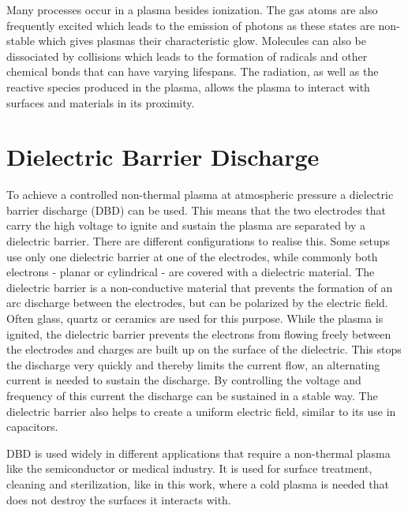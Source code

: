 Many processes occur in a plasma besides ionization. The gas atoms are also frequently excited which leads to the emission of photons as these states are non-stable which gives plasmas their characteristic glow. Molecules can also be dissociated by collisions which leads to the formation of radicals and other chemical bonds that can have varying lifespans. The radiation, as well as the reactive species produced in the plasma, allows the plasma to interact with surfaces and materials in its proximity.

\section{Dielectric Barrier Discharge}
To achieve a controlled non-thermal plasma at atmospheric pressure a dielectric barrier discharge (DBD) can be used. This means that the two electrodes that carry the high voltage to ignite and sustain the plasma are separated by a dielectric barrier. There are different configurations to realise this. Some setups use only one dielectric barrier at one of the electrodes, while commonly both electrons - planar or cylindrical - are covered with a dielectric material. The dielectric barrier is a non-conductive material that prevents the formation of an arc discharge between the electrodes, but can be polarized by the electric field. Often glass, quartz or ceramics are used for this purpose. While the plasma is ignited, the dielectric barrier prevents the electrons from flowing freely between the electrodes and charges are built up on the surface of the dielectric. This stops the discharge very quickly and thereby limits the current flow, an alternating current is needed to sustain the discharge. By controlling the voltage and frequency of this current the discharge can be sustained in a stable way. The dielectric barrier also helps to create a uniform electric field, similar to its use in capacitors. 

DBD is used widely in different applications that require a non-thermal plasma like the semiconductor or medical industry. It is used for surface treatment, cleaning and sterilization, like in this work, where a cold plasma is needed that does not destroy the surfaces it interacts with.

